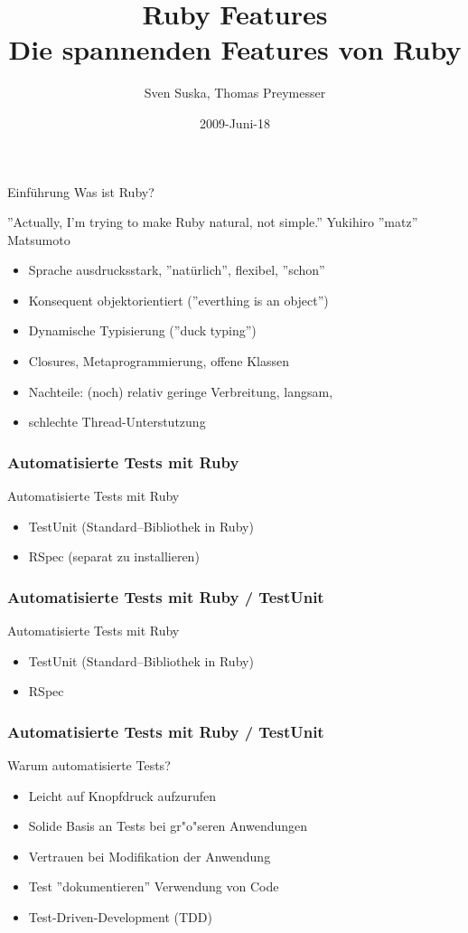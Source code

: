 \documentclass{beamer}
\title[Ruby]{Ruby Features\\Die spannenden Features von Ruby}
\author{Sven Suska, Thomas Preymesser}
\date{2009-Juni-18}
\begin{document}
\lstset{language=Ruby}
\lstset{basicstyle=\small,numbers=left, numberstyle=\tiny, numbersep=5pt}
\begin{frame}
\titlepage
\end{frame}


\begin{frame}{Einführung}
Was ist Ruby?

''Actually, I'm trying to make Ruby natural, not simple.''
Yukihiro ''matz'' Matsumoto


\begin{itemize}
\pause \item Sprache ausdrucksstark, ''natürlich'', flexibel, ''schon''
\pause \item Konsequent objektorientiert (''everthing is an object'')
\pause \item Dynamische Typisierung (''duck typing'')
\pause \item Closures, Metaprogrammierung, offene Klassen
\pause \item Nachteile: (noch) relativ geringe Verbreitung, langsam, 
\pause \item schlechte Thread-Unterstutzung
\end{itemize}
\end{frame}

\begin{frame}
  \frametitle{Automatisierte Tests mit Ruby}
  Automatisierte Tests mit Ruby
  \begin{itemize}
    \item<1-> TestUnit (Standard--Bibliothek in Ruby)
    \item<2-> RSpec (separat zu installieren)
  \end{itemize}
\end{frame}

\begin{frame}
  \frametitle{Automatisierte Tests mit Ruby / TestUnit}
  Automatisierte Tests mit Ruby
  \begin{itemize}
    \item TestUnit (Standard--Bibliothek in Ruby)
    \pause
    \item RSpec 
  \end{itemize}
\end{frame}

\begin{frame}

  \frametitle{Automatisierte Tests mit Ruby / TestUnit}
  Warum automatisierte Tests?
  \begin{itemize}
    \item Leicht auf Knopfdruck aufzurufen
    \item Solide Basis an Tests bei gr"o"seren Anwendungen
    \item Vertrauen bei Modifikation der Anwendung
    \item Test ''dokumentieren'' Verwendung von Code
    \item Test-Driven-Development (TDD)
  \end{itemize}
\end{frame}
\end{document}
